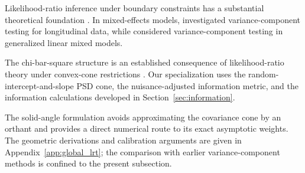 Likelihood-ratio inference under boundary constraints
has a substantial theoretical foundation
\citep{chant1974asymptotic,self1987asymptotic,
shapiro1985}. In mixed-effects models,
\citet{stram1994variance} investigated
variance-component testing for longitudinal data,
while \citet{zhang2008variance} considered
variance-component testing in generalized linear
mixed models.

The chi-bar-square structure is an established consequence of
likelihood-ratio theory under convex-cone restrictions
\citep{self1987asymptotic,shapiro1985,amelunxen2014}. Our
specialization uses the random-intercept-and-slope
PSD cone, the nuisance-adjusted information metric,
and the information calculations developed in
Section~\ref{sec:information}.

The solid-angle formulation avoids approximating
the covariance cone by an orthant and provides
a direct numerical route to its exact asymptotic
weights. The geometric derivations and calibration arguments are given in
Appendix~\ref{app:global_lrt}; the comparison with earlier
variance-component methods is confined to the present subsection.
